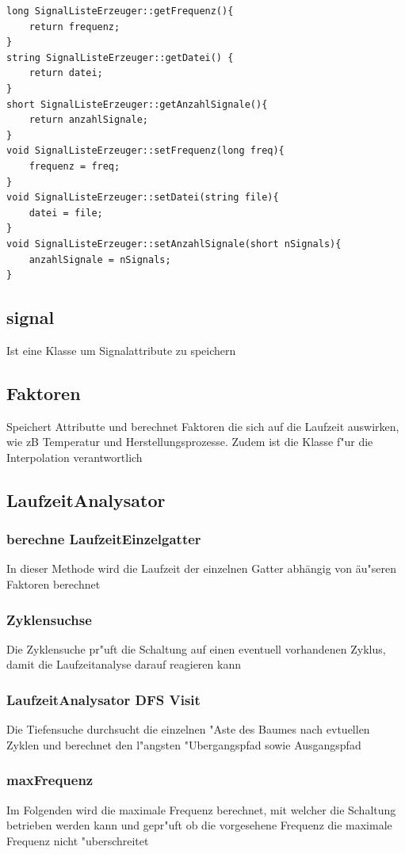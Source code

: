 \documentclass[a4paper,10pt,twoside]{report}
\begin{document}
\begin{lstlisting}
long SignalListeErzeuger::getFrequenz(){
    return frequenz;
}
string SignalListeErzeuger::getDatei() {
    return datei;
}
short SignalListeErzeuger::getAnzahlSignale(){
    return anzahlSignale;
}
void SignalListeErzeuger::setFrequenz(long freq){
    frequenz = freq;
}
void SignalListeErzeuger::setDatei(string file){
    datei = file;
}
void SignalListeErzeuger::setAnzahlSignale(short nSignals){
    anzahlSignale = nSignals;
}

\end{lstlisting}

\subsection{signal}
Ist eine Klasse um Signalattribute zu speichern
\subsection{Faktoren}
Speichert Attributte und berechnet Faktoren die sich auf die Laufzeit auswirken, wie zB Temperatur und Herstellungsprozesse. Zudem ist die Klasse f"ur die Interpolation verantwortlich
\subsection{LaufzeitAnalysator}
\subsubsection{berechne LaufzeitEinzelgatter}
In dieser Methode wird die Laufzeit der einzelnen Gatter abhängig von äu"seren Faktoren berechnet

\subsubsection{Zyklensuchse}
Die Zyklensuche pr"uft die Schaltung auf einen eventuell vorhandenen Zyklus, damit die Laufzeitanalyse darauf reagieren kann


\subsubsection{LaufzeitAnalysator DFS Visit}
Die Tiefensuche durchsucht die einzelnen "Aste des Baumes nach evtuellen Zyklen und berechnet den l"angsten "Ubergangspfad sowie Ausgangspfad


\subsubsection{maxFrequenz}
Im Folgenden wird die maximale Frequenz berechnet, mit welcher die Schaltung betrieben werden kann und gepr"uft ob die vorgesehene Frequenz die maximale Frequenz nicht "uberschreitet
\end{document}
